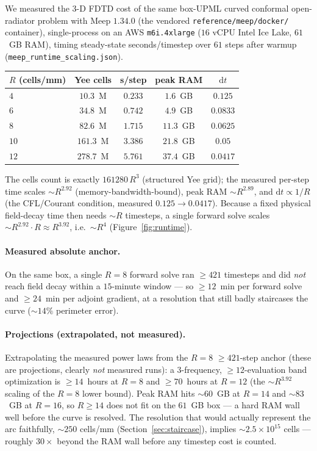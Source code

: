 \documentclass{anvil-paper}
\begin{document}
We measured the 3-D FDTD cost of the same box-UPML curved conformal open-radiator
problem with Meep $1.34.0$ (the vendored \texttt{reference/meep/docker/}
container), single-process on an AWS \texttt{m6i.4xlarge} ($16$ vCPU Intel Ice
Lake, $61$~GB RAM), timing steady-state seconds/timestep over $61$ steps after
warmup (\texttt{meep\_runtime\_scaling.json}).

\begin{center}
\begin{tabular}{lcccc}
\toprule
$R$ (cells/mm) & Yee cells & s/step & peak RAM & $\mathrm{d}t$ \\
\midrule
$4$  & $10.3$~M  & $0.233$ & $1.6$~GB  & $0.125$ \\
$6$  & $34.8$~M  & $0.742$ & $4.9$~GB  & $0.0833$ \\
$8$  & $82.6$~M  & $1.715$ & $11.3$~GB & $0.0625$ \\
$10$ & $161.3$~M & $3.386$ & $21.8$~GB & $0.05$ \\
$12$ & $278.7$~M & $5.761$ & $37.4$~GB & $0.0417$ \\
\bottomrule
\end{tabular}
\end{center}

The cells count is exactly $161280\,R^3$ (structured Yee grid); the measured
per-step time scales $\sim\!R^{2.92}$ (memory-bandwidth-bound), peak RAM
$\sim\!R^{2.89}$, and $\mathrm{d}t \propto 1/R$ (the CFL/Courant condition,
measured $0.125\!\to\!0.0417$). Because a fixed physical field-decay time then
needs $\sim\!R$ timesteps, a single forward solve scales
$\sim\!R^{2.92}\cdot R \approx R^{3.92}$, i.e.\ $\sim\!R^4$
(Figure~\ref{fig:runtime}).

\paragraph{Measured absolute anchor.}
On the same box, a single $R=8$ forward solve ran $\ge\!421$ timesteps and did
\emph{not} reach field decay within a $15$-minute window --- so
$\ge\!12$~min per forward solve and $\ge\!24$~min per adjoint gradient, at a
resolution that still badly staircases the curve ($\sim\!14\%$ perimeter error).

\paragraph{Projections (extrapolated, not measured).}
Extrapolating the measured power laws from the $R=8$ $\ge\!421$-step anchor
(these are projections, clearly \emph{not} measured runs): a $3$-frequency,
$\ge\!12$-evaluation band optimization is $\ge\!14$~hours at $R=8$ and
$\ge\!70$~hours at $R=12$ (the $\sim\!R^{3.92}$ scaling of the $R=8$ lower
bound). Peak RAM hits $\sim\!60$~GB at $R=14$ and $\sim\!83$~GB at $R=16$, so
$R\!\ge\!14$ does not fit on the $61$~GB box --- a hard RAM wall well before the
curve is resolved. The resolution that would actually represent the arc
faithfully, $\sim\!250$ cells/mm (Section~\ref{sec:staircase}), implies
$\sim\!2.5\times10^{15}$ cells --- roughly $30\times$ beyond the RAM wall before
any timestep cost is counted.
\end{document}
